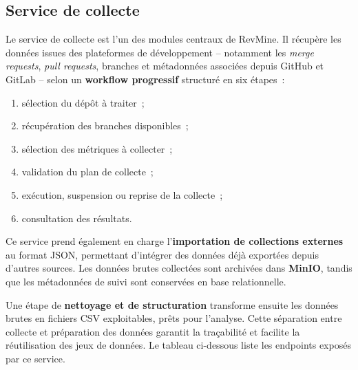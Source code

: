 \subsection{Service de collecte}

Le service de collecte est l'un des modules centraux de RevMine. Il récupère les données issues
des plateformes de développement -- notamment les \textit{merge requests}, \textit{pull requests},
branches et métadonnées associées depuis GitHub et GitLab -- selon un \textbf{workflow progressif}
structuré en six étapes~:

\begin{enumerate}
    \item sélection du dépôt à traiter~;
    \item récupération des branches disponibles~;
    \item sélection des métriques à collecter~;
    \item validation du plan de collecte~;
    \item exécution, suspension ou reprise de la collecte~;
    \item consultation des résultats.
\end{enumerate}

Ce service prend également en charge l'\textbf{importation de collections externes} au format
JSON, permettant d'intégrer des données déjà exportées depuis d'autres sources. Les données brutes
collectées sont archivées dans \textbf{MinIO}, tandis que les métadonnées de suivi sont conservées
en base relationnelle.

Une étape de \textbf{nettoyage et de structuration} transforme ensuite les données brutes en
fichiers CSV exploitables, prêts pour l'analyse. Cette séparation entre collecte et préparation
des données garantit la traçabilité et facilite la réutilisation des jeux de données. Le tableau
ci-dessous liste les endpoints exposés par ce service.


